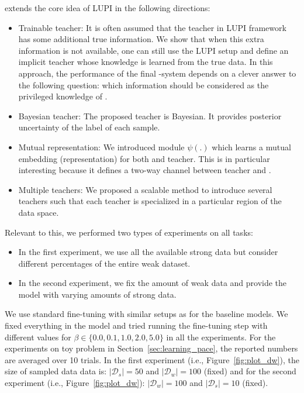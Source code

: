 \fwl extends the core idea of LUPI in the following directions:
\begin{itemize}[leftmargin=*]%
\setlength{\topsep}{0.1pt}
\setlength{\partopsep}{0.1pt}
\setlength{\itemsep}{0.1pt}
\setlength{\parskip}{0.1pt}
\setlength{\parsep}{0.1pt}
    \item Trainable teacher: It is often assumed that the teacher in LUPI framework has some additional true information. We show that when this extra information is not available, one can still use the LUPI setup and define an implicit teacher whose knowledge is learned from the true data. In this approach, the performance of the final \std-\tch system depends on a clever answer to the following question: which information should be considered as the privileged knowledge of \tch.
  \item Bayesian teacher: The proposed teacher is Bayesian. It provides posterior uncertainty of the label of each sample.
  \item Mutual representation: We introduced module $\psi(.)$ which learns a mutual embedding (representation) for both \std and teacher. This is in particular interesting because it defines a two-way channel between teacher and \std. 
  \item Multiple teachers: We proposed a scalable method to introduce several teachers such that each teacher is specialized in a particular region of the data space.
\end{itemize}


Relevant to this, we performed two types of experiments on all tasks:
%
\begin{itemize}
    \item In the first experiment, we use all the available strong data but consider different percentages of the entire weak dataset.
    \item In the second experiment, we fix the amount of weak data and provide the model with varying amounts of strong data.
\end{itemize} 
We use standard fine-tuning with similar setups as for the baseline models. 
We fixed everything in the model and tried running the fine-tuning step with different values for $\beta \in \{0.0, 0.1, 1.0, 2.0, 5.0\}$ in all the experiments.
For the experiments on toy problem in Section~\ref{sec:learning_pace}, the reported numbers are averaged over 10 trials. In the first experiment (i.e., Figure~\ref{fig:plot_dw}), the size of sampled data data is: $|\mathcal{D}_s| = 50$ and $|\mathcal{D}_w| = 100$ (fixed) and for the second experiment (i.e., Figure~\ref{fig:plot_dw}): $|\mathcal{D}_w| = 100$ and $|\mathcal{D}_s| = 10$ (fixed). 

